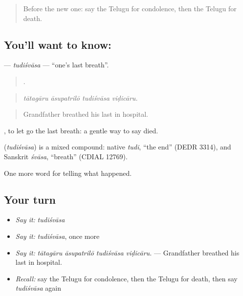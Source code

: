 \label{lesson:TE-C344-tudisvasa}



\begin{quote}
Before the new one: say the Telugu for condolence, then the Telugu for death.
\end{quote}

\subsection*{You'll want to know: }
\textbf{} — \emph{tudiśvāsa} — \textquotedblleft{}one's last breath\textquotedblright{}.

\begin{quote}
   .
\end{quote}

\begin{quote}
\emph{tātagāru āsupatrilō tudiśvāsa viḍicāru.}
\end{quote}

\begin{quote}
Grandfather breathed his last in hospital.
\end{quote}

 , to let go the last breath: a gentle way to say died.

\begin{cousinweb}
\textbf{} (\emph{tudiśvāsa}) is a mixed compound: native \emph{tudi}, \textquotedblleft{}the end\textquotedblright{} (DEDR 3314), and Sanskrit \emph{śvāsa}, \textquotedblleft{}breath\textquotedblright{} (CDIAL 12769).
\end{cousinweb}

\begin{grammarlens}[title={What you've built}]
One more word for telling what happened.
\end{grammarlens}

\subsection*{Your turn}
\begin{itemize}
\raggedright
  \item \emph{Say it:} \emph{tudiśvāsa}
  \item \emph{Say it:} \emph{tudiśvāsa}, once more
  \item \emph{Say it:} \emph{tātagāru āsupatrilō tudiśvāsa viḍicāru.} — Grandfather breathed his last in hospital.
  \item \emph{Recall:} say the Telugu for condolence, then the Telugu for death, then say \emph{tudiśvāsa} again
\end{itemize}

